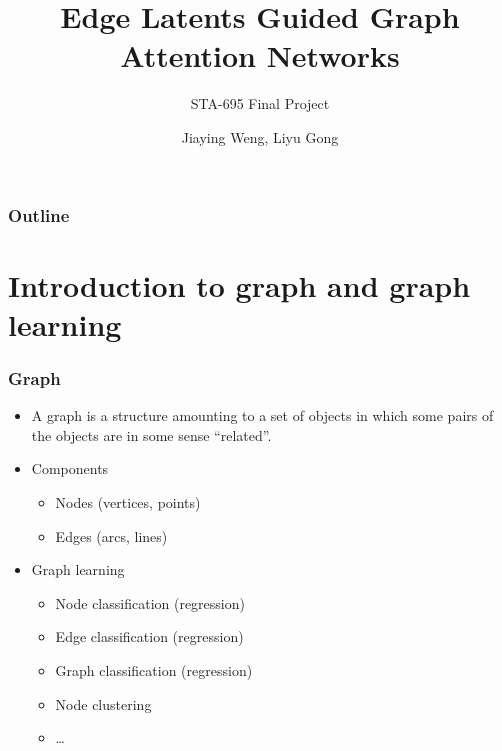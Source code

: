 \documentclass[compress]{beamer}
\title{Edge Latents Guided Graph Attention Networks}
\subtitle{STA-695 Final Project}
\author{Jiaying Weng, Liyu Gong}\institute{Department of Statistics\\ University of Kentucky}
\date{}
\begin{document}

{
\begin{withoutheadline}
	\begin{frame}
        \titlepage
    \end{frame} 
\end{withoutheadline}
} 

{
   \begin{frame}
       \frametitle{Outline}
       \tableofcontents
   \end{frame}
}


\section{Introduction to graph and graph learning}

\begin{frame}
\frametitle{Graph}
\begin{itemize}
\item A graph is a structure amounting to a set of objects in which some pairs of the objects are in some sense ``related''.
\item Components
  \begin{itemize}
  \item Nodes (vertices, points)
  \item Edges (arcs, lines)
  \end{itemize}
\item Graph learning
  \begin{itemize}
  \item Node classification (regression)
  \item Edge classification (regression)
  \item Graph classification (regression)
  \item Node clustering
  \item \ldots
  \end{itemize}
\end{itemize}
\end{frame}
\end{document}

